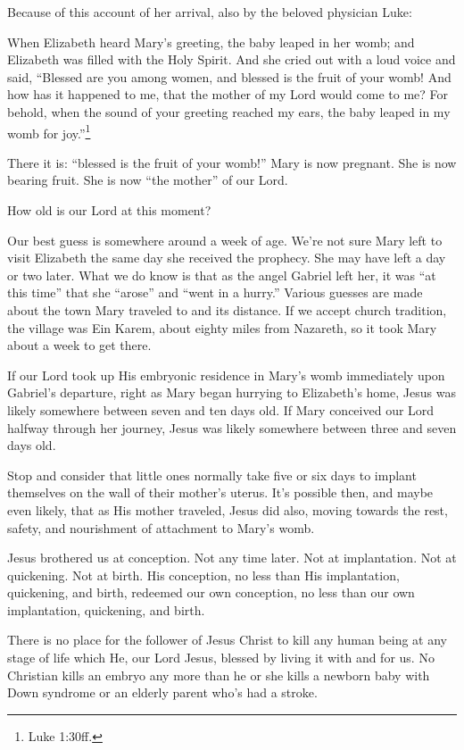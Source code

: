 \documentclass[
]{book}
\begin{document}
Because of this account of her arrival, also by the beloved physician Luke:

When Elizabeth heard Mary's greeting, the baby leaped in her womb; and Elizabeth was filled with the Holy Spirit. And she cried out with a loud voice and said, ``Blessed are you among women, and blessed is the fruit of your womb! And how has it happened to me, that the mother of my Lord would come to me? For behold, when the sound of your greeting reached my ears, the baby leaped in my womb for joy.''\footnote{Luke 1:30ff.}

There it is: ``blessed is the fruit of your womb!'' Mary is now pregnant. She is now bearing fruit. She is now ``the mother'' of our Lord.

How old is our Lord at this moment?

Our best guess is somewhere around a week of age. We're not sure Mary left to visit Elizabeth the same day she received the prophecy. She may have left a day or two later. What we do know is that as the angel Gabriel left her, it was ``at this time'' that she ``arose'' and ``went in a hurry.'' Various guesses are made about the town Mary traveled to and its distance. If we accept church tradition, the village was Ein Karem, about eighty miles from Nazareth, so it took Mary about a week to get there.

If our Lord took up His embryonic residence in Mary's womb immediately upon Gabriel's departure, right as Mary began hurrying to Elizabeth's home, Jesus was likely somewhere between seven and ten days old. If Mary conceived our Lord halfway through her journey, Jesus was likely somewhere between three and seven days old.

Stop and consider that little ones normally take five or six days to implant themselves on the wall of their mother's uterus. It's possible then, and maybe even likely, that as His mother traveled, Jesus did also, moving towards the rest, safety, and nourishment of attachment to Mary's womb.

Jesus brothered us at conception. Not any time later. Not at implantation. Not at quickening. Not at birth. His conception, no less than His implantation, quickening, and birth, redeemed our own conception, no less than our own implantation, quickening, and birth.

There is no place for the follower of Jesus Christ to kill any human being at any stage of life which He, our Lord Jesus, blessed by living it with and for us. No Christian kills an embryo any more than he or she kills a newborn baby with Down syndrome or an elderly parent who's had a stroke.
\end{document}
